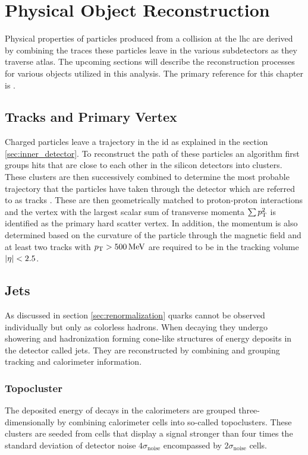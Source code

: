 \chapter{Physical Object Reconstruction}\label{ch:reco}

Physical properties of particles produced from a collision at the \ac{lhc} are derived by combining the traces these particles leave in the various subdetectors as they traverse \ac{atlas}. The upcoming sections will describe the reconstruction processes for various objects utilized in this analysis. The primary reference for this chapter is \citep{atlas2021optimisation}.

\section{Tracks and Primary Vertex}\label{sec:tracks}
Charged particles leave a trajectory in the \ac{id} as explained in the section \ref{sec:inner_detector}. To reconstruct the path of these particles an algorithm first groups hits that are close to each other in the silicon detectors into clusters. These clusters are then successively combined to determine the most probable trajectory that the particles have taken through the detector which are referred to as tracks \citep{aaboud2017performance}. These are then geometrically matched to proton-proton interactions and the vertex with the largest scalar sum of transverse momenta $\sum p_{\text{T}}^2$ is identified as the primary hard scatter vertex. In addition, the momentum is also determined based on the curvature of the particle through the magnetic field and at least two tracks with $p_{\text{T}}>\qty[]{500}{MeV}$ are required to be in the tracking volume $\left\vert\eta\right\vert<2.5$.

\section{Jets}\label{sec:jets}
As discussed in section \ref{sec:renormalization} quarks cannot be observed individually but only as colorless hadrons. When decaying they undergo showering and hadronization forming cone-like structures of energy deposits in the detector called jets. They are reconstructed by combining and grouping tracking and calorimeter information.

\subsection{Topocluster}
The deposited energy of decays in the calorimeters are grouped three-dimensionally by combining calorimeter cells into so-called topoclusters. These clusters are seeded from cells that display a signal stronger than four times the standard deviation of detector noise $4\sigma_\mathrm{noise}$ encompassed by $2\sigma_\mathrm{noise}$ cells.

